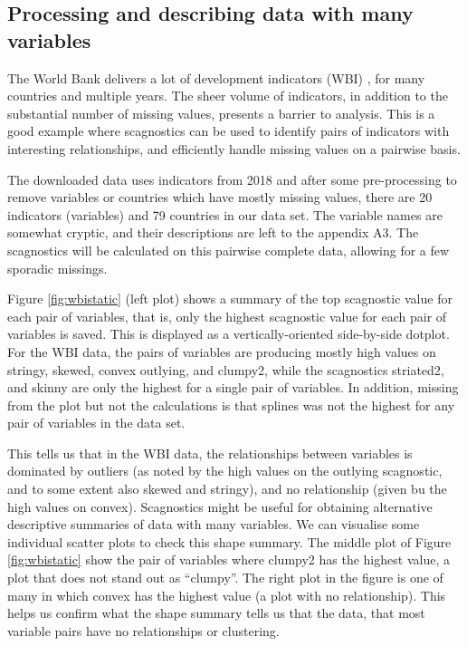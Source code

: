 \subsection{Processing and describing data with many variables}\label{processing-and-describing-data-with-many-variables}

The World Bank delivers a lot of development indicators (WBI) \citep{WBI}, for many countries and multiple years. The sheer volume of indicators, in addition to the substantial number of missing values, presents a barrier to analysis. This is a good example where scagnostics can be used to identify pairs of indicators with interesting relationships, and efficiently handle missing values on a pairwise basis.

The downloaded data uses indicators from 2018 and after some pre-processing to remove variables or countries which have mostly missing values, there are 20 indicators (variables) and 79 countries in our data set. The variable names are somewhat cryptic, and their descriptions are left to the appendix A3. The scagnostics will be calculated on this pairwise complete data, allowing for a few sporadic missings.

Figure \ref{fig:wbistatic} (left plot) shows a summary of the top scagnostic value for each pair of variables, that is, only the highest scagnostic value for each pair of variables is saved. This is displayed as a vertically-oriented side-by-side dotplot. For the WBI data, the pairs of variables are producing mostly high values on stringy, skewed, convex outlying, and clumpy2, while the scagnostics striated2, and skinny are only the highest for a single pair of variables. In addition, missing from the plot but not the calculations is that splines was not the highest for any pair of variables in the data set.

This tells us that in the WBI data, the relationships between variables is dominated by outliers (as noted by the high values on the outlying scagnostic, and to some extent also skewed and stringy), and no relationship (given bu the high values on convex). Scagnostics might be useful for obtaining alternative descriptive summaries of data with many variables. We can visualise some individual scatter plots to check this shape summary. The middle plot of Figure \ref{fig:wbistatic} show the pair of variables where clumpy2 has the highest value, a plot that does not stand out as ``clumpy''. The right plot in the figure is one of many in which convex has the highest value (a plot with no relationship). This helps us confirm what the shape summary tells us that the data, that most variable pairs have no relationships or clustering.

